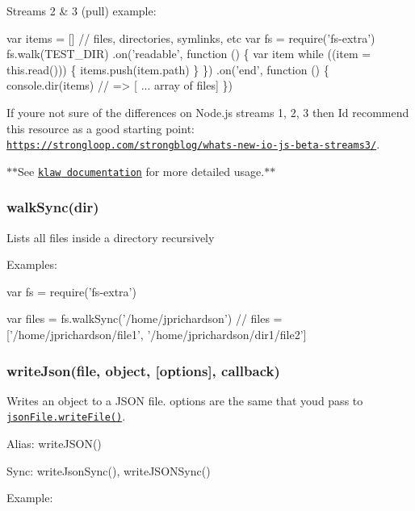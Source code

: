Streams 2 \& 3 (pull) example\+:


\begin{DoxyCode}
var items = [] // files, directories, symlinks, etc
var fs = require('fs-extra')
fs.walk(TEST\_DIR)
  .on('readable', function () \{
    var item
    while ((item = this.read())) \{
      items.push(item.path)
    \}
  \})
  .on('end', function () \{
    console.dir(items) // => [ ... array of files]
  \})
\end{DoxyCode}


If you\textquotesingle{}re not sure of the differences on Node.\+js streams 1, 2, 3 then I\textquotesingle{}d recommend this resource as a good starting point\+: \href{https://strongloop.com/strongblog/whats-new-io-js-beta-streams3/}{\tt https\+://strongloop.\+com/strongblog/whats-\/new-\/io-\/js-\/beta-\/streams3/}.

$\ast$$\ast$\+See \href{https://github.com/jprichardson/node-klaw}{\tt {\ttfamily klaw} documentation} for more detailed usage.$\ast$$\ast$

\subsubsection*{walk\+Sync(dir)}

Lists all files inside a directory recursively

Examples\+:


\begin{DoxyCode}
var fs = require('fs-extra')

var files = fs.walkSync('/home/jprichardson')
// files = ['/home/jprichardson/file1', '/home/jprichardson/dir1/file2']
\end{DoxyCode}


\subsubsection*{write\+Json(file, object, \mbox{[}options\mbox{]}, callback)}

Writes an object to a J\+S\+ON file. {\ttfamily options} are the same that you\textquotesingle{}d pass to \href{https://github.com/jprichardson/node-jsonfile#writefilefilename-options-callback}{\tt {\ttfamily json\+File.\+write\+File()}}.

Alias\+: {\ttfamily write\+J\+S\+O\+N()}

Sync\+: {\ttfamily write\+Json\+Sync()}, {\ttfamily write\+J\+S\+O\+N\+Sync()}

Example\+:



